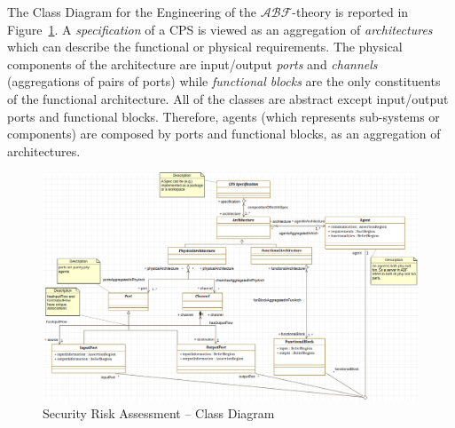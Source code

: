 \documentclass[conference]{IEEEtran}
\newcommand{\assertionRegion}{\mathcal{A}}
\newcommand{\beliefRegion}{\mathcal{B}}
\newcommand{\factRegion}{\mathcal{F}}
\newcommand{\abftheory}{\assertionRegion\beliefRegion\factRegion}
\begin{document}
\appendix
The Class Diagram for the Engineering of the $\abftheory$-theory is reported in
Figure~\ref{fig:secraclassdiagram}. A \emph{specification} of a CPS is viewed
as an aggregation of \emph{architectures} which can describe the functional or
physical requirements. The physical components of the architecture are
input/output \emph{ports} and \emph{channels} (aggregations of pairs of ports)
while \emph{functional blocks} are the only constituents of the functional
architecture. All of the classes are abstract except input/output ports and
functional blocks. Therefore, agents (which represents sub-systems or
components) are composed by ports and functional blocks, as an aggregation of 
architectures.

\begin{figure}
	\centering
	\includegraphics[width=\textwidth]{secra_classDiagram.png}
	\caption{Security Risk Assessment -- Class Diagram}
	\label{fig:secraclassdiagram}
\end{figure}
\printbibliography


%
%
\end{document}
